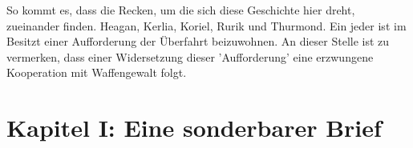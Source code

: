 \documentclass[11pt, openany]{article} %
\begin{document}
So kommt es, dass die Recken, um die sich diese Geschichte hier dreht, zueinander finden. Heagan, Kerlia, Koriel, Rurik und Thurmond. %
Ein jeder ist im Besitzt einer Aufforderung der \"Uberfahrt beizuwohnen. An dieser Stelle ist zu vermerken, dass einer Widersetzung dieser 'Aufforderung' eine erzwungene Kooperation mit Waffengewalt folgt.

\section{Kapitel I: Eine sonderbarer Brief}
\end{document}
